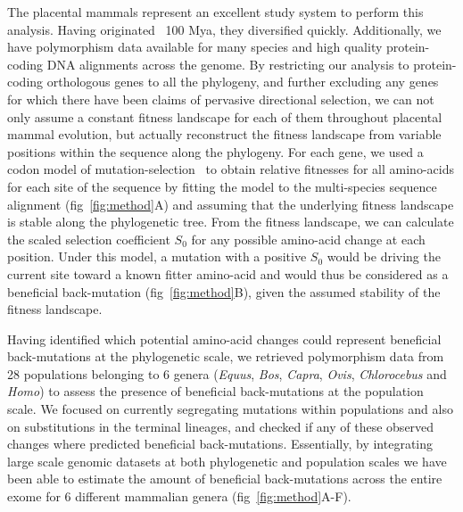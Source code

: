 \documentclass{article}
\newcommand{\Sphy}{S_{0}}
\begin{document}
    The placental mammals represent an excellent study system to perform this analysis.
    Having originated ~100 Mya\cite{kumar_timetree_2017}, they diversified quickly.
    Additionally, we have polymorphism data available for many species\cite{howe_ensembl_2021} and high quality protein-coding DNA alignments across the genome\cite{ranwez_orthomam_2007, scornavacca_orthomam_2019}.
    By restricting our analysis to protein-coding orthologous genes to all the phylogeny, and further excluding any genes for which there have been claims of pervasive directional selection, we can not only assume a constant fitness landscape for each of them throughout placental mammal evolution, but actually reconstruct the fitness landscape from variable positions within the sequence along the phylogeny.
    For each gene, we used a codon model of mutation-selection~\cite{halpern_evolutionary_1998, mccandlish_modeling_2014} to obtain relative fitnesses for all amino-acids for each site of the sequence by fitting the model to the multi-species sequence alignment (fig~\ref{fig:method}A) and assuming that the underlying fitness landscape is stable along the phylogenetic tree.
    From the fitness landscape, we can calculate the scaled selection coefficient $\Sphy$ for any possible amino-acid change at each position.
    Under this model, a mutation with a positive $\Sphy$ would be driving the current site toward a known fitter amino-acid and would thus be considered as a beneficial back-mutation (fig~\ref{fig:method}B), given the assumed stability of the fitness landscape.

    Having identified which potential amino-acid changes could represent beneficial back-mutations at the phylogenetic scale, we retrieved polymorphism data from 28 populations belonging to 6 genera (\textit{Equus}, \textit{Bos}, \textit{Capra}, \textit{Ovis}, \textit{Chlorocebus} and \textit{Homo}) to assess the presence of beneficial back-mutations at the population scale.
    We focused on currently segregating mutations within populations and also on substitutions in the terminal lineages, and checked if any of these observed changes where predicted beneficial back-mutations.
    Essentially, by integrating large scale genomic datasets at both phylogenetic and population scales we have been able to estimate the amount of beneficial back-mutations across the entire exome for 6 different mammalian genera (fig~\ref{fig:method}A-F).
\end{document}
